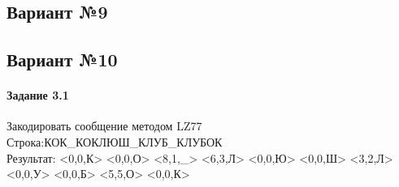 \documentclass[a4paper, 12pt]{article}
\begin{document}
\pagebreak
\subsection{Вариант №9}

\pagebreak
\subsection{Вариант №10}
\paragraph{Задание 3.1}

Закодировать сообщение методом LZ77\\
Строка:КОК\_КОКЛЮШ\_КЛУБ\_КЛУБОК\\
Результат: <0,0,К> <0,0,О> <8,1,\_> <6,3,Л> <0,0,Ю> <0,0,Ш> <3,2,Л> <0,0,У> <0,0,Б> <5,5,О> <0,0,К>\\
\end{document}
